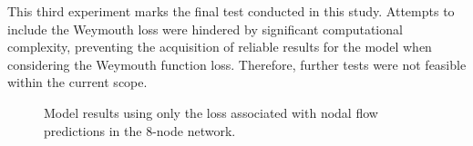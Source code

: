This third experiment marks the final test conducted in this study. Attempts to include the Weymouth loss were hindered by significant computational complexity, preventing the acquisition of reliable results for the model when considering the Weymouth function loss. Therefore, further tests were not feasible within the current scope.

\begin{figure}
    \centering
    \setlength{}        
    \setlength{} 
    
    \caption{Model results using only the loss associated with nodal flow predictions in the 8-node network.}
    \label{fig:col_base_f_bal_results_non_lineal}
\end{figure}



